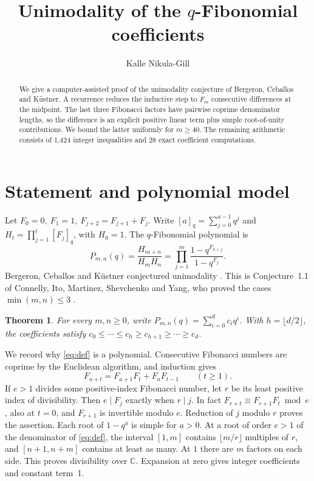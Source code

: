 \documentclass[11pt]{article}
\title{Unimodality of the \(q\)-Fibonomial coefficients}
\author{Kalle Nikula-Gill}
\date{}
\newtheorem{theorem}{Theorem}
\begin{document}
\maketitle
\begin{abstract}
We give a computer-assisted proof of the unimodality conjecture of
Bergeron, Ceballos and K\"ustner. A recurrence reduces the inductive
step to \(F_m\) consecutive differences at the midpoint. The last three
Fibonacci factors have pairwise coprime denominator lengths, so the
difference is an explicit positive linear term plus simple
root-of-unity contributions. We bound the latter uniformly for
\(m\ge40\). The remaining arithmetic consists of 1,424 integer
inequalities and 28 exact coefficient computations.
\end{abstract}

\section{Statement and polynomial model}
Let \(F_0=0,\ F_1=1,\ F_{j+2}=F_{j+1}+F_j\). Write
\([a]_q=\sum_{j=0}^{a-1}q^j\) and \(H_t=\prod_{j=1}^{t}[F_j]_q\),
with \(H_0=1\). The \(q\)-Fibonomial polynomial is
\begin{equation}\label{eq:def}
 P_{m,n}(q)=\frac{H_{m+n}}{H_mH_n}
 =\prod_{j=1}^{m}\frac{1-q^{F_{n+j}}}{1-q^{F_j}} .
\end{equation}
Bergeron, Ceballos and K\"ustner conjectured unimodality
\cite[Conjecture~2.5]{BCK}. This is Conjecture~1.1 of Connelly, Ito,
Martinez, Shevchenko and Yang, who proved the cases
\(\min(m,n)\le3\) \cite[Theorem~1.2]{CIMSY}.

\begin{theorem}\label{thm:main}
For every \(m,n\ge0\), write \(P_{m,n}(q)=\sum_{i=0}^d c_iq^i\).
With \(h=\lfloor d/2\rfloor\), the coefficients satisfy
\(c_0\le\cdots\le c_h\ge c_{h+1}\ge\cdots\ge c_d\).
\end{theorem}

We record why \eqref{eq:def} is a polynomial. Consecutive Fibonacci
numbers are coprime by the Euclidean algorithm, and induction gives
\begin{equation}\label{eq:add}
 F_{a+t}=F_{a+1}F_t+F_aF_{t-1}\qquad(t\ge1).
\end{equation}
If \(e>1\) divides some positive-index Fibonacci number, let \(r\) be
its least positive index of divisibility. Then \(e\mid F_j\) exactly
when \(r\mid j\). In fact \(F_{r+t}\equiv F_{r+1}F_t\bmod e\), also
at \(t=0\), and \(F_{r+1}\) is invertible modulo \(e\). Reduction of
\(j\) modulo \(r\) proves the assertion. Each root of \(1-q^a\) is
simple for \(a>0\). At a root of order \(e>1\) of the denominator of
\eqref{eq:def}, the interval \([1,m]\) contains \(\lfloor m/r\rfloor\)
multiples of \(r\), and \([n+1,n+m]\) contains at least as many. At
\(1\) there are \(m\) factors on each side. This proves divisibility
over \(\mathbb C\). Expansion at zero gives integer coefficients and
constant term~1.
\end{document}
